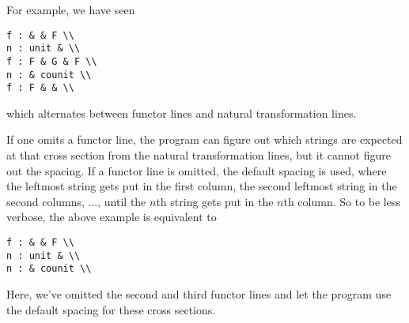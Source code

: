 \documentclass{amsart}
\newcommand{\vlength}{0.2cm}
\begin{document}
\begin{example}
For example, we have seen
\vspace\vlength
\begin{verbatim}
f : & & F \\
n : unit & \\
f : F & G & F \\
n : & counit \\
f : F & & \\
\end{verbatim}
\vspace\vlength
    which alternates between functor lines and natural transformation lines.

If one omits a functor line, the program can figure out which strings are expected at that cross
section from the natural transformation lines, but it cannot figure out the spacing.
If a functor line is omitted, the default spacing is used, where the leftmost string gets put in the
first column, the second leftmost string in the second columns, ..., until the $n$th string
gets put in the $n$th column.
So to be less verbose, the above example is equivalent to
\vspace\vlength
\begin{verbatim}
f : & & F \\
n : unit & \\
n : & counit \\
\end{verbatim}
\vspace\vlength
Here, we've omitted the second and third functor lines and let the program use the default spacing
    for these cross sections.
\end{example}
\end{document}
